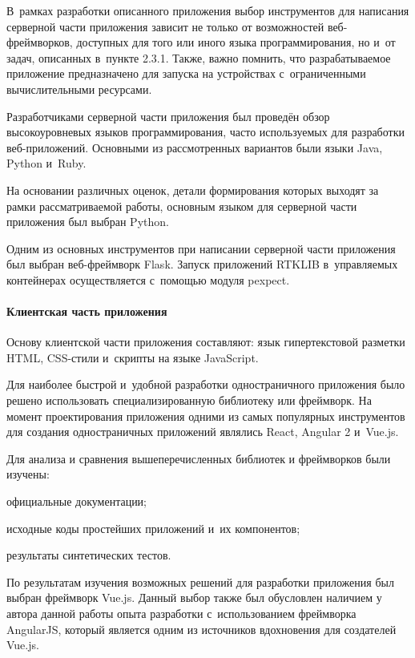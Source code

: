 \documentclass[pta]{../../../scs-iam}
\begin{document}
В~рамках разработки описанного приложения выбор инструментов для написания серверной части приложения зависит не только от возможностей веб-фреймворков, доступных для того или иного языка программирования, но и~от задач, описанных в~пункте 2.3.1. Также, важно помнить, что разрабатываемое приложение предназначено для запуска на устройствах с~ограниченными вычислительными ресурсами.

Разработчиками серверной части приложения был проведён обзор высокоуровневых языков программирования, часто используемых для разработки веб-приложений. Основными из рассмотренных вариантов были языки Java, Python и~Ruby.

На основании различных оценок, детали формирования которых выходят за рамки рассматриваемой работы, основным языком для серверной части приложения был выбран Python.

Одним из основных инструментов при написании серверной части приложения был выбран веб-фреймворк Flask. Запуск приложений RTKLIB в~управляемых контейнерах осуществляется с~помощью модуля pexpect.

\paragraph{Клиентская часть приложения}

Основу клиентской части приложения составляют: язык гипертекстовой разметки HTML, CSS-стили и~скрипты на языке JavaScript.

Для наиболее быстрой и~удобной разработки одностраничного приложения было решено использовать специализированную библиотеку или фреймворк. На момент проектирования приложения одними из самых популярных инструментов для создания одностраничных приложений являлись React, Angular 2 и~Vue.js.

Для анализа и сравнения вышеперечисленных библиотек и фреймворков были изучены:
\begin{dashitemize}
  \item официальные документации;
  \item исходные коды простейших приложений и~их компонентов;
  \item результаты синтетических тестов.
\end{dashitemize}

По результатам изучения возможных решений для разработки приложения был выбран фреймворк Vue.js. Данный выбор также был обусловлен наличием у автора данной работы опыта разработки с~использованием фреймворка AngularJS, который является одним из источников вдохновения для создателей Vue.js.
\end{document}
